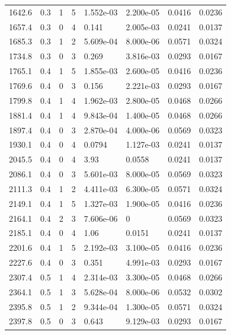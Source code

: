 \documentclass[preview]{standalone}
\begin{document}
{{{\begin{tabular}{L{1.2cm}C{1.2cm} C{0.3cm}C{0.5cm} C{1.4cm}C{1.4cm} C{1.4cm}C{1.4cm}}
  1642.6  &   0.3  & 1     &  5 &  1.552e-03  & 2.200e-05  & 0.0416 &  0.0236   \\ 
  1657.4  &   0.3  & 0     &  4 &  0.141  & 2.005e-03  & 0.0241 &  0.0137   \\ 
  1685.3  &   0.3  & 1     &  2 &  5.609e-04  & 8.000e-06  & 0.0571 &  0.0324   \\ 
  1734.8  &   0.3  & 0     &  3 &  0.269  & 3.816e-03  & 0.0293 &  0.0167   \\ 
  1765.1  &   0.4  & 1     &  5 &  1.855e-03  & 2.600e-05  & 0.0416 &  0.0236   \\ 
  1769.6  &   0.4  & 0     &  3 &  0.156  & 2.221e-03  & 0.0293 &  0.0167   \\ 
  1799.8  &   0.4  & 1     &  4 &  1.962e-03  & 2.800e-05  & 0.0468 &  0.0266   \\ 
  1881.4  &   0.4  & 1     &  4 &  9.843e-04  & 1.400e-05  & 0.0468 &  0.0266   \\ 
  1897.4  &   0.4  & 0     &  3 &  2.870e-04  & 4.000e-06  & 0.0569 &  0.0323   \\ 
  1930.1  &   0.4  & 0     &  4 &  0.0794  & 1.127e-03  & 0.0241 &  0.0137   \\ 
  2045.5  &   0.4  & 0     &  4 &  3.93  & 0.0558  & 0.0241 &  0.0137   \\ 
  2086.1  &   0.4  & 0     &  3 &  5.601e-03  & 8.000e-05  & 0.0569 &  0.0323   \\ 
  2111.3  &   0.4  & 1     &  2 &  4.411e-03  & 6.300e-05  & 0.0571 &  0.0324   \\ 
  2149.1  &   0.4  & 1     &  5 &  1.327e-03  & 1.900e-05  & 0.0416 &  0.0236   \\ 
  2164.1  &   0.4  & 2     &  3 &  7.606e-06  & 0  & 0.0569 &  0.0323   \\ 
  2185.1  &   0.4  & 0     &  4 &  1.06  & 0.0151  & 0.0241 &  0.0137   \\ 
  2201.6  &   0.4  & 1     &  5 &  2.192e-03  & 3.100e-05  & 0.0416 &  0.0236   \\ 
  2227.6  &   0.4  & 0     &  3 &  0.351  & 4.991e-03  & 0.0293 &  0.0167   \\ 
  2307.4  &   0.5  & 1     &  4 &  2.314e-03  & 3.300e-05  & 0.0468 &  0.0266   \\ 
  2364.1  &   0.5  & 1     &  3 &  5.628e-04  & 8.000e-06  & 0.0532 &  0.0302   \\ 
  2395.8  &   0.5  & 1     &  2 &  9.344e-04  & 1.300e-05  & 0.0571 &  0.0324   \\ 
  2397.8  &   0.5  & 0     &  3 &  0.643  & 9.129e-03  & 0.0293 &  0.0167   \\ 

\end{tabular}}}}
\end{document}
